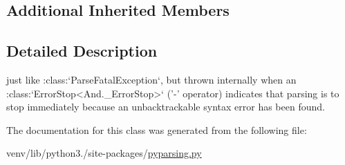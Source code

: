 \subsection*{Additional Inherited Members}


\subsection{Detailed Description}
\begin{DoxyVerb}just like :class:`ParseFatalException`, but thrown internally
when an :class:`ErrorStop<And._ErrorStop>` ('-' operator) indicates
that parsing is to stop immediately because an unbacktrackable
syntax error has been found.
\end{DoxyVerb}
 

The documentation for this class was generated from the following file\+:\begin{DoxyCompactItemize}
\item 
venv/lib/python3./site-\/packages/\hyperlink{pyparsing_8py}{pyparsing.\+py}\end{DoxyCompactItemize}
